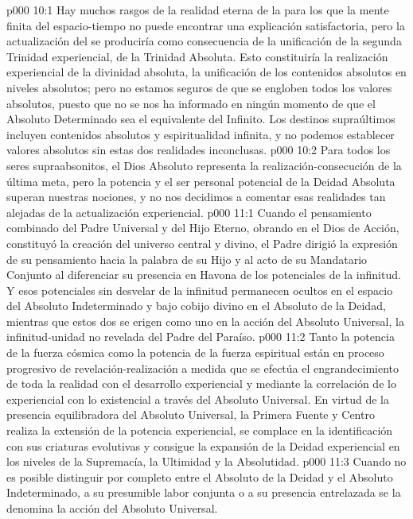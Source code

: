 \vs p000 10:1 Hay muchos rasgos de la realidad eterna de la  para los que la mente finita del espacio\hyp{}tiempo no puede encontrar una explicación satisfactoria, pero la actualización del  se produciría como consecuencia de la unificación de la segunda Trinidad experiencial, de la Trinidad Absoluta. Esto constituiría la realización experiencial de la divinidad absoluta, la unificación de los contenidos absolutos en niveles absolutos; pero no estamos seguros de que se engloben todos los valores absolutos, puesto que no se nos ha informado en ningún momento de que el Absoluto Determinado sea el equivalente del Infinito. Los destinos supraúltimos incluyen contenidos absolutos y espiritualidad infinita, y no podemos establecer valores absolutos sin estas dos realidades inconclusas.
\vs p000 10:2 Para todos los seres supraabsonitos, el Dios Absoluto representa la realización\hyp{}consecución de la última meta, pero la potencia y el ser personal potencial de la Deidad Absoluta superan nuestras nociones, y no nos decidimos a comentar esas realidades tan alejadas de la actualización experiencial.
\vs p000 11:1 Cuando el pensamiento combinado del Padre Universal y del Hijo Eterno, obrando en el Dios de Acción, constituyó la creación del universo central y divino, el Padre dirigió la expresión de su pensamiento hacia la palabra de su Hijo y al acto de su Mandatario Conjunto al diferenciar su presencia en Havona de los potenciales de la infinitud. Y esos potenciales sin desvelar de la infinitud permanecen ocultos en el espacio del Absoluto Indeterminado y bajo cobijo divino en el Absoluto de la Deidad, mientras que estos dos se erigen como uno en la acción del Absoluto Universal, la infinitud\hyp{}unidad no revelada del Padre del Paraíso.
\vs p000 11:2 Tanto la potencia de la fuerza cósmica como la potencia de la fuerza espiritual están en proceso progresivo de revelación\hyp{}realización a medida que se efectúa el engrandecimiento de toda la realidad con el desarrollo experiencial y mediante la correlación de lo experiencial con lo existencial a través del Absoluto Universal. En virtud de la presencia equilibradora del Absoluto Universal, la Primera Fuente y Centro realiza la extensión de la potencia experiencial, se complace en la identificación con sus criaturas evolutivas y consigue la expansión de la Deidad experiencial en los niveles de la Supremacía, la Ultimidad y la Absolutidad.
\vs p000 11:3 \pc Cuando no es posible distinguir por completo entre el Absoluto de la Deidad y el Absoluto Indeterminado, a su presumible labor conjunta o a su presencia entrelazada se la denomina la acción del Absoluto Universal.
